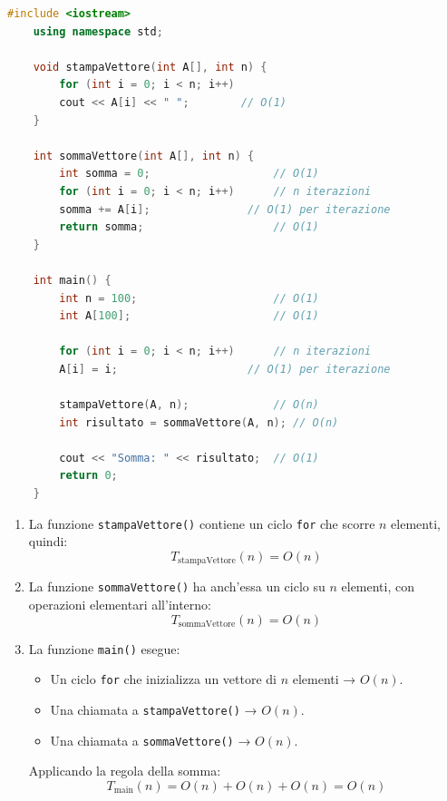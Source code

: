 \begin{lstlisting}[language=C++]
	#include <iostream>
	using namespace std;
	
	void stampaVettore(int A[], int n) {
		for (int i = 0; i < n; i++)
		cout << A[i] << " ";        // O(1)
	}
	
	int sommaVettore(int A[], int n) {
		int somma = 0;                   // O(1)
		for (int i = 0; i < n; i++)      // n iterazioni
		somma += A[i];               // O(1) per iterazione
		return somma;                    // O(1)
	}
	
	int main() {
		int n = 100;                     // O(1)
		int A[100];                      // O(1)
		
		for (int i = 0; i < n; i++)      // n iterazioni
		A[i] = i;                    // O(1) per iterazione
		
		stampaVettore(A, n);             // O(n)
		int risultato = sommaVettore(A, n); // O(n)
		
		cout << "Somma: " << risultato;  // O(1)
		return 0;
	}
\end{lstlisting}


\begin{enumerate}
	\item La funzione \texttt{stampaVettore()} contiene un ciclo \texttt{for} che scorre $n$ elementi, quindi:
	\[
	T_{\text{stampaVettore}}(n) = O(n)
	\]
	
	\item La funzione \texttt{sommaVettore()} ha anch’essa un ciclo su $n$ elementi, con operazioni elementari all’interno:
	\[
	T_{\text{sommaVettore}}(n) = O(n)
	\]
	
	\item La funzione \texttt{main()} esegue:
	\begin{itemize}
		\item Un ciclo \texttt{for} che inizializza un vettore di $n$ elementi → $O(n)$.
		\item Una chiamata a \texttt{stampaVettore()} → $O(n)$.
		\item Una chiamata a \texttt{sommaVettore()} → $O(n)$.
	\end{itemize}
	Applicando la regola della somma:
	\[
	T_{\text{main}}(n) = O(n) + O(n) + O(n) = O(n)
	\]
\end{enumerate}









\vspace{1cm}
